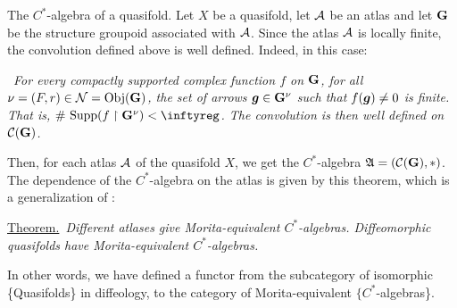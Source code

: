 \begin{Article}{The $C^*$-algebra of a quasifold.}{}
  Let $X$ be a quasifold,
  let $\mathcal{A}$ be an atlas and let ${\mathbf G}$ be the structure groupoid associated with $\mathcal{A}$.
  Since the atlas $\mathcal{A}$ is locally finite,
  the convolution defined above is well defined.
  Indeed,
  in this case:
  
  ~{\itshape For every compactly supported complex function $f$ on ${\mathbf G}$,
  for all $\nu = (F,r) \in \mathcal{N} = {\operatorname{Obj}}({\mathbf G})$,
  the set of arrows  ${\boldsymbol g} \in {\mathbf G}^\nu$ such that $f({\boldsymbol g}) \neq 0$ is finite.
  That is,
  $\#\,\Supp(f \restriction \GG^\nu) < \infty$.
  The convolution is then well defined on $\mathcal{C}({\mathbf G})$.}
  
  Then,
  for each atlas $\mathcal{A}$ of the quasifold $X$,
  we get the $C^*$-algebra ${\mathfrak A} = (\mathcal{C}({\mathbf G}),*)$.
  The dependence of the $C^*$-algebra on the atlas is given by this theorem,
  which is a generalization of \cite[\textsection\,9]{IZL18}:
  
  \uline{Theorem.}~{\itshape Different atlases give Morita-equivalent $C^*$-algebras.
  Diffeomorphic quasifolds have Morita-equivalent $C^*$-algebras.}
  
  In other words,
  we have defined a functor from the subcategory of isomorphic \{Quasifolds\} in diffeology,
  to the category of Morita-equivalent $\{C^*$-algebras\}.
\end{Article} %

